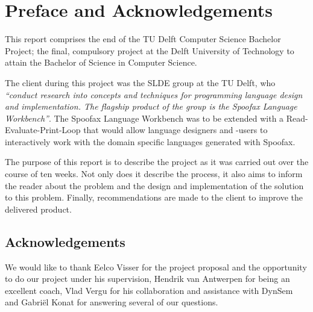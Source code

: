 \chapter{Preface and Acknowledgements}
\label{cha:preface-acks}

This report comprises the end of the TU Delft Computer Science Bachelor Project;
the final, compulsory project at the Delft University of Technology to attain
the Bachelor of Science in Computer Science.

The client during this project was the SLDE group at the TU Delft, who
\textit{``conduct research into concepts and techniques for programming language
design and implementation. The flagship product of the group is the Spoofax
Language Workbench''}. The Spoofax Language Workbench was to be extended with a
Read-Evaluate-Print-Loop that would allow language designers and -users to
interactively work with the domain specific languages generated with Spoofax.

The purpose of this report is to describe the project as it was carried out over
the course of ten weeks. Not only does it describe the process, it also aims to
inform the reader about the problem and the design and implementation of the
solution to this problem. Finally, recommendations are made to the client to
improve the delivered product.

\section*{Acknowledgements}

We would like to thank Eelco Visser for the project proposal and the
opportunity to do our project under his supervision, Hendrik van Antwerpen for
being an excellent coach, Vlad Vergu for his collaboration and assistance with
DynSem and Gabri\"el Konat for answering several of our questions.

